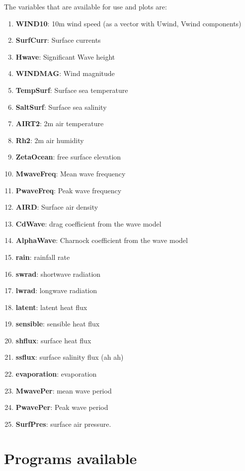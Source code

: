 \documentclass[12pt]{amsart}
\begin{document}
The variables that are available for use and plots are:
\begin{enumerate}
\item {\bf WIND10}: 10m wind speed (as a vector with Uwind, Vwind components)
\item {\bf SurfCurr}: Surface currents
\item {\bf Hwave}: Significant Wave height
\item {\bf WINDMAG}: Wind magnitude
\item {\bf TempSurf}: Surface sea temperature
\item {\bf SaltSurf}: Surface sea salinity
\item {\bf AIRT2}: 2m air temperature
\item {\bf Rh2}: 2m air humidity
\item {\bf ZetaOcean}: free surface elevation
\item {\bf MwaveFreq}: Mean wave frequency
\item {\bf PwaveFreq}: Peak wave frequency
\item {\bf AIRD}: Surface air density
\item {\bf CdWave}: drag coefficient from the wave model
\item {\bf AlphaWave}: Charnock coefficient from the wave model
\item {\bf rain}: rainfall rate
\item {\bf swrad}: shortwave radiation
\item {\bf lwrad}: longwave radiation
\item {\bf latent}: latent heat flux
\item {\bf sensible}: sensible heat flux
\item {\bf shflux}: surface heat flux
\item {\bf ssflux}: surface salinity flux (ah ah)
\item {\bf evaporation}: evaporation
\item {\bf MwavePer}: mean wave period
\item {\bf PwavePer}: Peak wave period
\item {\bf SurfPres}: surface air pressure.
\end{enumerate}








\section{Programs available}
\end{document}
